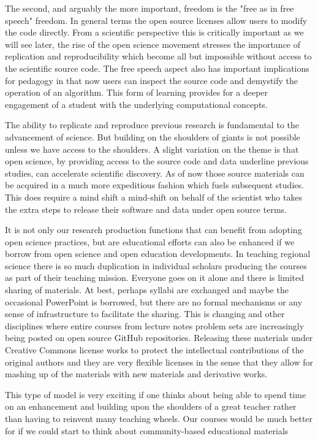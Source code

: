 \documentclass[11pt]{article}
\begin{document}
The second, and arguably the more important, freedom is the "free as in free
speech" freedom. In general terms the open source licenses allow users to
modify the code directly. From a scientific perspective this is critically
important as we will see later, the rise of the open science movement stresses
the importance of replication and reproducibility which become all but
impossible without access to the scientific source code. The free speech aspect
also has important implications for pedagogy in that now users can inspect the
source code and demystify the operation of an algorithm. This form of learning
provides for a deeper engagement of a student with the underlying computational
concepts.


The ability to replicate and reproduce previous research is fundamental to
the advancement of science. But building on the shoulders of giants is not
possible unless we have access to the shoulders. A slight variation on the
theme is that open science, by providing access to the source code and data
underline previous studies, can accelerate scientific discovery. As of now those
source materials can be acquired in a much more expeditious fashion which fuels
subsequent studies. This does require a mind shift a mind-shift on behalf of
the scientist who takes the extra steps to release their software
and data under open source terms.

It is not only our research production functions that can benefit from adopting
open science practices, but are educational efforts can also be enhanced if we
borrow from open science and open education developments. In teaching regional
science there is so much duplication in individual scholars producing the
courses as part of their teaching mission. Everyone goes on it alone and there
is limited sharing of materials. At best, perhaps syllabi are exchanged and
maybe the occasional PowerPoint is borrowed, but there are no formal mechanisms
or any sense of infrastructure to facilitate the sharing. This is changing and
other disciplines where entire courses from lecture notes problem sets are
increasingly being posted on open source GitHub repositories. Releasing these
materials under Creative Commons license works to protect the intellectual
contributions of the original authors and they are very flexible licenses in
the sense that they allow for mashing up of the materials with new materials
and derivative works.

This type of model is very exciting if one thinks about being able to spend
time on an enhancement  and building upon the shoulders of a great teacher
rather than having to reinvent many teaching wheels. Our courses would be much
better for if we could start to think about community-based educational
materials
\end{document}
